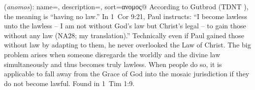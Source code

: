 \item[Lawless,]

(\textit{anomos}):
{
    name=,
    description={},
    sort=ανομος@
}
According to Gutbrod (TDNT ), the meaning is ``having no law.'' In 1~Cor 9:21, Paul instructs: ``I become lawless unto the lawless -- I am not without God's law but Christ's legal -- to gain those without any law (NA28; my translation).'' Technically even if Paul gained those without law by adapting to them, he never overlooked the Law of Christ. The big problem arises when someone disregards the worldly and the divine law simultaneously and thus becomes truly lawless. When people do so, it is applicable to fall away from the Grace of God into the mosaic jurisdiction if they do not become lawful.
Found in 1~Tim 1:9.
